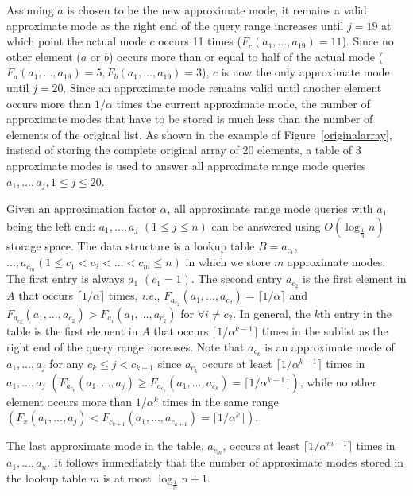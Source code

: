 \documentclass{llncs}
\begin{document}
Assuming $a$ is chosen to be the new approximate mode, it remains a
valid approximate mode as the right end of the query range increases until 
$j=19$ at which point the actual mode $c$ occurs 11 times ($F_{c}(a_1,\ldots,a_{19})=11$). 
Since no other element ($a$ or $b$) occurs more than or equal to half of the actual mode 
($F_a(a_1,\ldots,a_{19})=5,F_b(a_1,\ldots,a_{19})=3$), $c$ is now the only 
approximate mode until $j=20$. Since an approximate
mode remains valid until another element occurs more than $1/\alpha$ times the
current approximate mode, the number of approximate modes that have to be stored is much 
less than the number of elements of the original list. As shown in the 
example of Figure~\ref{originalarray}, instead 
of storing the complete original array of 20 elements, a table of 3 approximate modes is used to 
answer all approximate range mode queries $a_1,\ldots,a_j,1 \leq j \leq 20$.  


Given an approximation factor $\alpha$, all approximate range mode queries 
with $a_1$ being the left end: 
$a_1,\ldots,a_j$ $(1\leq j \leq n)$ can be answered using $O(\log_{\frac{1}{\alpha}} n)$
storage space. The data structure is a lookup table $B=a_{c_1}$, $\ldots,a_{c_m}(1 \leq
c_1 < c_2 < \ldots < c_m \leq n)$ in which we store $m$ approximate modes. 
The first entry is always $a_1$ $(c_1 = 1)$. The second entry $a_{c_2}$
is the first element in $A$ that occurs $\lceil 1/\alpha \rceil$ times, 
{\it i.e.}, 
$F_{a_{c_2}}(a_1, \ldots, a_{c_2}) = \lceil 1/\alpha \rceil$ and 
$F_{a_{c_2}}(a_1, \ldots, a_{c_2}) > F_{a_i}(a_1,\ldots,a_{c_2})$
for $\forall i \neq c_2$. 
In general, the $k$th entry in the table is the first element in $A$ that 
occurs $\lceil 1/\alpha^{k-1} \rceil$ times in the sublist 
as the right end of the query range increases. 
Note that $a_{c_k}$ is an approximate mode of 
$a_1,\ldots,a_j$ for any $c_k\leq j < c_{k+1}$ since $a_{c_k}$ occurs at least
$\lceil 1/\alpha^{k-1} \rceil$ times in $a_1,\ldots,a_j$ 
$(F_{a_{c_k}}(a_1,\ldots,a_j) \ge F_{a_{c_k}}(a_1,\ldots,a_{c_k}) = 
\lceil 1/\alpha^{k-1} \rceil)$, 
while no other element occurs more than $1/\alpha^k$ times in the same range
$(F_x(a_1,\ldots,a_j) < F_{c_{k+1}}(a_1,\ldots,a_{c_{k+1}}) = \lceil 1/\alpha^k \rceil)$.

The last approximate mode in the table, $a_{c_m}$, occurs at least 
$\lceil 1/\alpha^{m-1} \rceil$ times in $a_1,\ldots,a_n$. It follows 
immediately that the number of approximate modes stored in the lookup table 
$m$ is at most $\log_{\frac{1}{\alpha}} n + 1$. 
\end{document}
